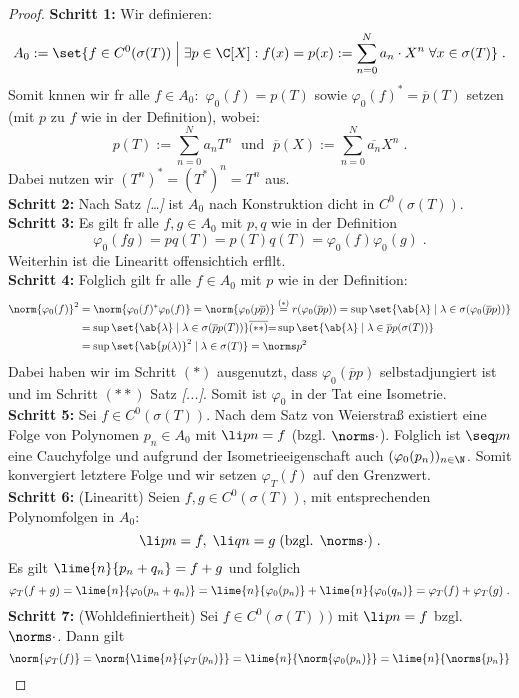 \begin{proof}
	\textbf{Schritt 1:} Wir definieren:
	\[A_0 := \set{f \in C^0(\sigma(T)) \;\Big\vert\; \exists p \in \C[X]: f(x) = p(x):= \sum_{n=0}^N a_n \cdot X^n \;\forall x \in \sigma(T) }\;.\]
	Somit k\os nnen wir f\us r alle  \(f \in A_0:\) \(\varphi_0 (f) = p(T)\) sowie \(\varphi_0(f)^* = \overline{p}(T)\) setzen (mit $p$ zu $f$ wie in der Definition), wobei:
	\[p(T) := \sum_{n=0}^N a_n T^n\; \text{ und }\;\overline{p}(X) := \sum_{n=0}^N \overline{a_n}X^n \;.\]
	Dabei nutzen wir \((T^n)^* = (T^*)^n = T^n\) aus.\\
	\textbf{Schritt 2:} Nach Satz \textit{[\ldots]} ist $A_0$ nach Konstruktion dicht in \(C^0(\sigma(T))\).\\
	\textbf{Schritt 3:} Es gilt f\us r alle \(f, g \in A_0\) mit $p, q$ wie in der Definition
	\[ \varphi_0(fg) = pq(T) =  p(T) q(T) = \varphi_0(f)\varphi_0(g)\;.\]
	Weiterhin ist die Linearit\as t offensichtich erf\us llt. \\
	\textbf{Schritt 4:} Folglich gilt f\us r alle $f \in A_0$ mit $p$ wie in der Definition:
	\begin{align*}
	\norm{\varphi_0(f)}^2 &= \norm{\varphi_0(f)^* \varphi_0(f)} = \norm{\varphi_0(p \overline{p})} \overset{(*)}{=} r(\varphi_0(\overline p p )) = \sup\set{\ab{\lambda} \;\vert\; \lambda \in \sigma(\varphi_0(\overline p p ))} \\
	&  = \sup\set{\ab{\lambda} \;\vert\; \lambda \in \sigma(\overline p p (T))} \overline{(**)}{=} \sup\set{\ab{\lambda} \;\vert\; \lambda \in \overline p p (\sigma(T))}\\& = \sup\set{\ab{p(\lambda)}^2 \;\vert\; \lambda \in \sigma(T)}  = \norms p ^2
	\end{align*}
	Dabei haben wir im Schritt \((*)\) ausgenutzt, dass \(\varphi_0(\overline p p )\) selbstadjungiert ist und im Schritt \((**)\) Satz \textit{[...]}. Somit ist $\varphi_0$ in der Tat eine Isometrie. \\
	\textbf{Schritt 5:} Sei \(f\in C^0(\sigma(T))\). Nach dem Satz von Weierstra\ss{} existiert eine Folge von Polynomen \(p_n \in A_0\) mit \(\li pn = f\) (bzgl. \(\norms\cdot\)). Folglich ist \(\seq pn \) eine Cauchyfolge und aufgrund der Isometrieeigenschaft auch \((\varphi_0(p_n))_{n\in\N}\). Somit konvergiert letztere Folge und wir setzen \(\varphi_T(f)\) auf den Grenzwert.\\
	\textbf{Schritt 6:} (Linearit\as t) Seien \(f,g \in C^0(\sigma(T))\), mit entsprechenden Polynomfolgen in $A_0$: 
	\[\li pn = f,\; \li qn = g \;\text{(bzgl. $\norms\cdot$)}\;.\]
	Es gilt \(\lime{n}{p_n + q_n}= f+g\) und folglich
	\[\varphi_T(f+g) = \lime{n}{\varphi_0(p_n + q_n)} = \lime{n}{\varphi_0(p_n)} + \lime{n}{\varphi_0(q_n)} = \varphi_T(f) + \varphi_T(g)\;.\]
	\textbf{Schritt 7:} (Wohldefiniertheit) Sei \(f\in C^0(\sigma(T)))\) mit \(\li pn = f\) bzgl. \(\norms\cdot\). Dann gilt 
	\[\norm{\varphi_T(f)} = \norm{\lime{n}{\varphi_T(p_n)}} = \lime{n}{\norm{\varphi_0(p_n)}} = \lime{n}{\norms{p_n}} \]
	\end{proof}